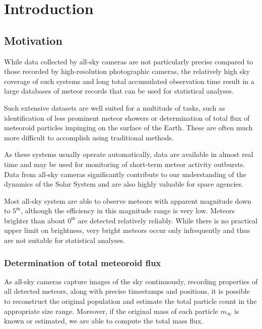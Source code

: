 \section{Introduction}
    \subsection{Motivation}
        While data collected by all-sky cameras are not particularly precise compared to those recorded by high-resolution photographic cameras,
        the relatively high sky coverage of such systems and long total accumulated observation time
        result in a large databases of meteor records that can be used for statistical analyses.
        
        Such extensive datasets are well suited for a multitude of tasks, such as identification of less prominent meteor
        showers or determination of total flux of meteoroid particles impinging on the surface of the Earth.
        These are often much more difficult to accomplish using traditional methods.
        
        As these systems usually operate automatically, data are available in almost real time and may be
        used for monitoring of short-term meteor activity outbursts. Data from all-sky cameras significantly
        contribute to our understanding of the dynamics of the Solar System and are also highly valuable for space agencies.
        
        Most all-sky system are able to observe meteors with apparent magnitude down to $5^{\mathrm{m}}$, although
        the efficiency in this magnitude range is very low. Meteors brighter than about $0^{\mathrm{m}}$ are detected relatively reliably.
        While there is no practical upper limit on brightness, very bright meteors occur only infrequently
        and thus are not suitable for statistical analyses.

        \subsubsection{Determination of total meteoroid flux} \label{imf}
            As all-sky cameras capture images of the sky continuously, recording properties of all detected meteors,
            along with precise timestamps and positions, it is possible to reconstruct the original
            population and estimate the total particle count in the appropriate size range.
            Moreover, if the original mass of each particle $m_{\infty}$ is known or estimated,
            we are able to compute the total mass flux.

